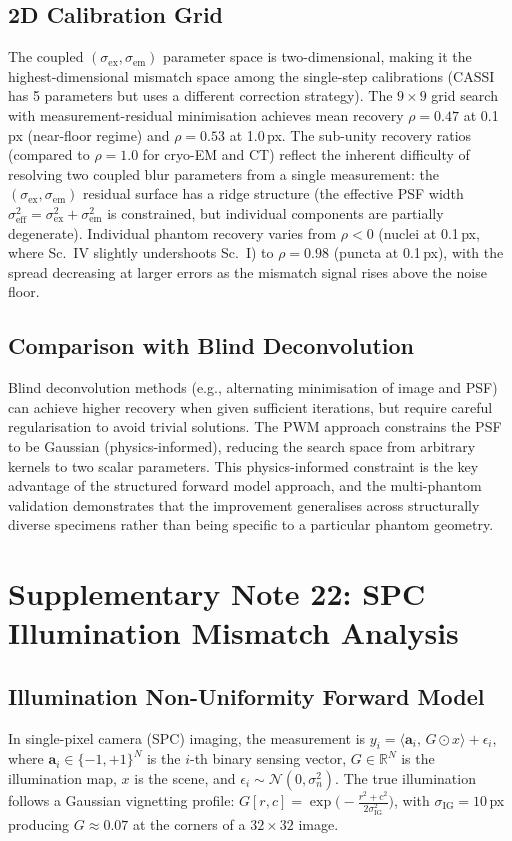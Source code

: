 \documentclass[11pt]{article}
\begin{document}
\subsection{2D Calibration Grid}
The coupled $(\sigma_{\mathrm{ex}}, \sigma_{\mathrm{em}})$ parameter space is two-dimensional, making it the highest-dimensional mismatch space among the single-step calibrations (CASSI has 5 parameters but uses a different correction strategy). The $9 \times 9$ grid search with measurement-residual minimisation achieves mean recovery $\rho{=}0.47$ at 0.1\,px (near-floor regime) and $\rho{=}0.53$ at 1.0\,px.
The sub-unity recovery ratios (compared to $\rho{=}1.0$ for cryo-EM and CT) reflect the inherent difficulty of resolving two coupled blur parameters from a single measurement: the $(\sigma_{\mathrm{ex}}, \sigma_{\mathrm{em}})$ residual surface has a ridge structure (the effective PSF width $\sigma_{\mathrm{eff}}^2 = \sigma_{\mathrm{ex}}^2 + \sigma_{\mathrm{em}}^2$ is constrained, but individual components are partially degenerate).
Individual phantom recovery varies from $\rho < 0$ (nuclei at 0.1\,px, where Sc.~IV slightly undershoots Sc.~I) to $\rho = 0.98$ (puncta at 0.1\,px), with the spread decreasing at larger errors as the mismatch signal rises above the noise floor.

\subsection{Comparison with Blind Deconvolution}
Blind deconvolution methods (e.g., alternating minimisation of image and PSF) can achieve higher recovery when given sufficient iterations, but require careful regularisation to avoid trivial solutions. The PWM approach constrains the PSF to be Gaussian (physics-informed), reducing the search space from arbitrary kernels to two scalar parameters. This physics-informed constraint is the key advantage of the structured forward model approach, and the multi-phantom validation demonstrates that the improvement generalises across structurally diverse specimens rather than being specific to a particular phantom geometry.


\section{Supplementary Note 22: SPC Illumination Mismatch Analysis}
\label{sec:note_spc}

\subsection{Illumination Non-Uniformity Forward Model}
In single-pixel camera (SPC) imaging, the measurement is $y_i = \langle \mathbf{a}_i,\, G \odot x \rangle + \epsilon_i$,
where $\mathbf{a}_i \in \{-1,+1\}^N$ is the $i$-th binary sensing vector, $G \in \mathbb{R}^N$ is the
illumination map, $x$ is the scene, and $\epsilon_i \sim \mathcal{N}(0, \sigma_n^2)$.
The true illumination follows a Gaussian vignetting profile:
$G[r,c] = \exp\!\bigl(-\tfrac{r^2 + c^2}{2\sigma_\mathrm{IG}^2}\bigr)$, with $\sigma_\mathrm{IG}{=}10$\,px
producing $G{\approx}0.07$ at the corners of a $32{\times}32$ image.
\end{document}
